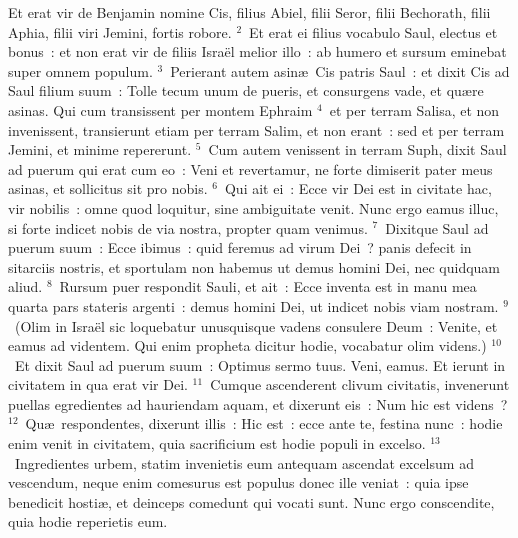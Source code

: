 \lettrine[lines=10,image=true,loversize=0.05,lraise=-0.03]{E}{}t erat vir de Benjamin nomine Cis, filius Abiel, filii Seror, filii Bechorath, filii Aphia, filii viri Jemini, fortis robore.
${}^{2}$~Et erat ei filius vocabulo Saul, electus et bonus~: et non erat vir de filiis Isra\"el melior illo~: ab humero et sursum eminebat super omnem populum.
${}^{3}$~Perierant autem asin\ae\ Cis patris Saul~: et dixit Cis ad Saul filium suum~: Tolle tecum unum de pueris, et consurgens vade, et qu\ae re asinas. Qui cum transissent per montem Ephraim
${}^{4}$~et per terram Salisa, et non invenissent, transierunt etiam per terram Salim, et non erant~: sed et per terram Jemini, et minime repererunt.
${}^{5}$~Cum autem venissent in terram Suph, dixit Saul ad puerum qui erat cum eo~: Veni et revertamur, ne forte dimiserit pater meus asinas, et sollicitus sit pro nobis.
${}^{6}$~Qui ait ei~: Ecce vir Dei est in civitate hac, vir nobilis~: omne quod loquitur, sine ambiguitate venit. Nunc ergo eamus illuc, si forte indicet nobis de via nostra, propter quam venimus.
${}^{7}$~Dixitque Saul ad puerum suum~: Ecce ibimus~: quid feremus ad virum Dei~? panis defecit in sitarciis nostris, et sportulam non habemus ut demus homini Dei, nec quidquam aliud.
${}^{8}$~Rursum puer respondit Sauli, et ait~: Ecce inventa est in manu mea quarta pars stateris argenti~: demus homini Dei, ut indicet nobis viam nostram.
${}^{9}$~(Olim in Isra\"el sic loquebatur unusquisque vadens consulere Deum~: Venite, et eamus ad videntem. Qui enim propheta dicitur hodie, vocabatur olim videns.)
${}^{10}$~Et dixit Saul ad puerum suum~: Optimus sermo tuus. Veni, eamus. Et ierunt in civitatem in qua erat vir Dei.
${}^{11}$~Cumque ascenderent clivum civitatis, invenerunt puellas egredientes ad hauriendam aquam, et dixerunt eis~: Num hic est videns~?
${}^{12}$~Qu\ae\ respondentes, dixerunt illis~: Hic est~: ecce ante te, festina nunc~: hodie enim venit in civitatem, quia sacrificium est hodie populi in excelso.
${}^{13}$~Ingredientes urbem, statim invenietis eum antequam ascendat excelsum ad vescendum, neque enim comesurus est populus donec ille veniat~: quia ipse benedicit hosti\ae , et deinceps comedunt qui vocati sunt. Nunc ergo conscendite, quia hodie reperietis eum.


